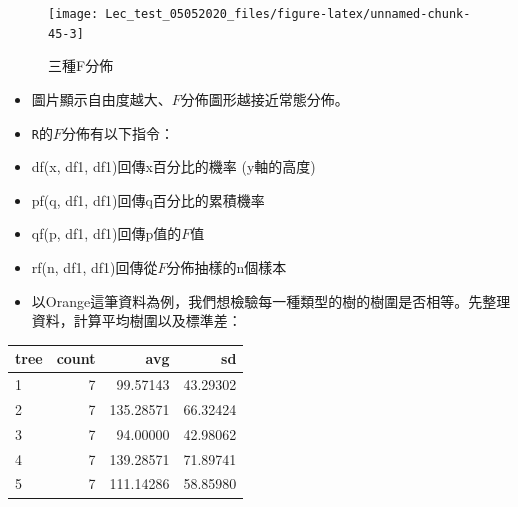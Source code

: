 \documentclass[hyperref,]{ctexart}
\newenvironment{Shaded}{\begin{snugshade}}{\end{snugshade}}
\newcommand{\DataTypeTok}[1]{\textcolor[rgb]{0.13,0.29,0.53}{#1}}
\newcommand{\KeywordTok}[1]{\textcolor[rgb]{0.13,0.29,0.53}{\textbf{#1}}}
\newcommand{\NormalTok}[1]{#1}
\newcommand{\OperatorTok}[1]{\textcolor[rgb]{0.81,0.36,0.00}{\textbf{#1}}}
\newcommand{\OtherTok}[1]{\textcolor[rgb]{0.56,0.35,0.01}{#1}}
\newcommand{\StringTok}[1]{\textcolor[rgb]{0.31,0.60,0.02}{#1}}
\begin{document}
\begin{figure}

\texttt{[image: Lec\_test\_05052020\_files/figure-latex/unnamed-chunk-45-3]} \hfill{}

\caption{\label{fig:fcurve}三種F分佈}\label{fig:unnamed-chunk-453}
\end{figure}

\begin{itemize}
\item
  圖片顯示自由度越大、\(F\)分佈圖形越接近常態分佈。
\item
  \texttt{R}的\(F\)分佈有以下指令：
\item
  df(x, df1, df1)回傳x百分比的機率 (y軸的高度)
\item
  pf(q, df1, df1)回傳q百分比的累積機率
\item
  qf(p, df1, df1)回傳p值的\(F\)值
\item
  rf(n, df1, df1)回傳從\(F\)分佈抽樣的n個樣本
\item
  以Orange這筆資料為例，我們想檢驗每一種類型的樹的樹圍是否相等。先整理資料，計算平均樹圍以及標準差：
\end{itemize}

\begin{Shaded}
\end{Shaded}

\begin{table}[H]
\centering
\begin{tabular}{l|r|r|r}
\hline
tree & count & avg & sd\\
\hline
1 & 7 & 99.57143 & 43.29302\\
\hline
2 & 7 & 135.28571 & 66.32424\\
\hline
3 & 7 & 94.00000 & 42.98062\\
\hline
4 & 7 & 139.28571 & 71.89741\\
\hline
5 & 7 & 111.14286 & 58.85980\\
\hline
\end{tabular}
\end{table}
\end{document}
